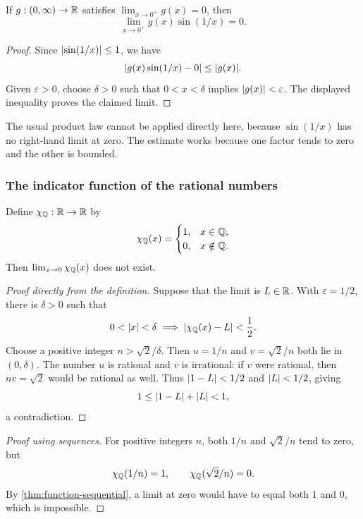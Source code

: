 \documentclass[11pt,a4paper]{amsart}
\begin{document}
\begin{example}
  If \(g:(0,\infty)\to\mathbb{R}\) satisfies \(\lim_{x\to0^+}g(x)=0\), then
  \[
    \lim_{x\to0^+}g(x)\sin(1/x)=0.
  \]
\end{example}

\begin{proof}
  Since \(\lvert\sin(1/x)\rvert\leq1\), we have
  \[
    \lvert g(x)\sin(1/x)-0\rvert\leq\lvert g(x)\rvert.
  \]
  Given \(\varepsilon>0\), choose \(\delta>0\) such that
  \(0<x<\delta\) implies \(\lvert g(x)\rvert<\varepsilon\).
  The displayed inequality proves the claimed limit.
\end{proof}

\begin{remark}
  The usual product law cannot be applied directly here, because
  \(\sin(1/x)\) has no right-hand limit at zero. The estimate works
  because one factor tends to zero and the other is bounded.
\end{remark}

\subsubsection{The indicator function of the rational numbers}

\begin{example}
  Define \(\chi_{\mathbb{Q}}:\mathbb{R}\to\mathbb{R}\) by
  \[
    \chi_{\mathbb{Q}}(x)=
    \begin{cases}
      1,&x\in\mathbb{Q},\\
      0,&x\notin\mathbb{Q}.
    \end{cases}
  \]
  Then \(\lim_{x\to0}\chi_{\mathbb{Q}}(x)\) does not exist.
\end{example}

\begin{proof}[Proof directly from the definition]
  Suppose that the limit is \(L\in\mathbb{R}\). With \(\varepsilon=1/2\),
  there is \(\delta>0\) such that
  \[
    0<\lvert x\rvert<\delta\implies\lvert\chi_{\mathbb{Q}}(x)-L\rvert<\frac12.
  \]
  Choose a positive integer \(n>\sqrt2/\delta\). Then
  \(u=1/n\) and \(v=\sqrt2/n\) both lie in \((0,\delta)\).
  The number \(u\) is rational and \(v\) is irrational: if \(v\)
  were rational, then \(nv=\sqrt2\) would be rational as well.
  Thus \(\lvert1-L\rvert<1/2\) and \(\lvert L\rvert<1/2\), giving
  \[
    1\leq\lvert1-L\rvert+\lvert L\rvert<1,
  \]
  a contradiction.
\end{proof}

\begin{proof}[Proof using sequences]
  For positive integers \(n\), both \(1/n\) and \(\sqrt2/n\)
  tend to zero, but
  \[
    \chi_{\mathbb{Q}}(1/n)=1,\qquad \chi_{\mathbb{Q}}(\sqrt2/n)=0.
  \]
  By \cref{thm:function-sequential}, a limit at zero would have to
  equal both \(1\) and \(0\), which is impossible.
\end{proof}
\end{document}
